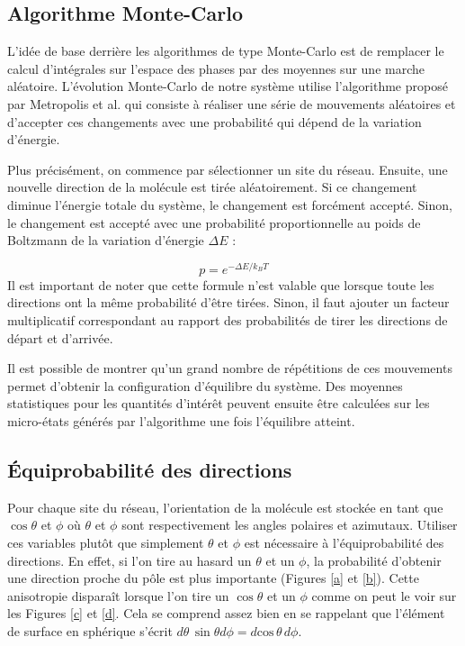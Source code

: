 \documentclass[11pt]{article}
\numberwithin{equation}{section}
\begin{document}

\subsection{Algorithme Monte-Carlo}

L'idée de base derrière les algorithmes de type Monte-Carlo est de remplacer le calcul d'intégrales sur l'espace des phases par des moyennes sur une marche aléatoire. L'évolution Monte-Carlo de notre système utilise l'algorithme proposé par Metropolis et al. \cite{metropolis} qui consiste à réaliser une série de mouvements aléatoires et d'accepter ces changements avec une probabilité qui dépend de la variation d'énergie.\medskip

Plus précisément, on commence par sélectionner un site du réseau. Ensuite, une nouvelle direction de la molécule est tirée aléatoirement. Si ce changement diminue l'énergie totale du système, le changement est forcément accepté. Sinon, le changement est accepté avec une probabilité proportionnelle au poids de Boltzmann de la variation d'énergie $\Delta E$ :

\begin{equation}
p = e^{-\Delta E / k_B T}
\label{boltzmannprob}
\end{equation}
Il est important de noter que cette formule n'est valable que lorsque toute les directions ont la même probabilité d'être tirées. Sinon, il faut ajouter un facteur multiplicatif correspondant au rapport des probabilités de tirer les directions de départ et d'arrivée.
\medskip

Il est possible de montrer qu'un grand nombre de répétitions de ces mouvements permet d'obtenir la configuration d'équilibre du système. Des moyennes statistiques pour les quantités d'intérêt peuvent ensuite être calculées sur les micro-états générés par l'algorithme une fois l'équilibre atteint.

\subsection{Équiprobabilité des directions}
Pour chaque site du réseau, l'orientation de la molécule est stockée en tant que $\cos \theta$ et $\phi$ où $\theta$ et $\phi$ sont respectivement les angles polaires et azimutaux. Utiliser ces variables plutôt que simplement $\theta$ et $\phi$ est nécessaire à l'équiprobabilité des directions. En effet, si l'on tire au hasard un $\theta$ et un $\phi$, la probabilité d'obtenir une direction proche du pôle est plus importante (Figures \ref{a} et \ref{b}). Cette anisotropie disparaît lorsque l'on tire un $\cos \theta$ et un $\phi$ comme on peut le voir sur les Figures \ref{c} et \ref{d}. Cela se comprend assez bien en se rappelant que l'élément de surface en sphérique s'écrit $d\theta\, \sin \theta d\phi = d\text{cos}\,\theta\, d\phi$.
\end{document}
